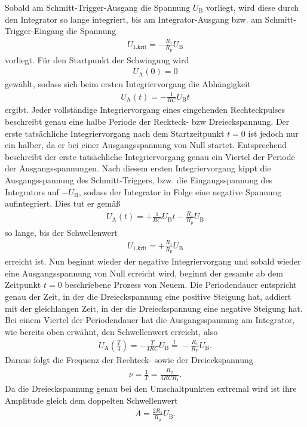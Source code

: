 Sobald am Schmitt-Trigger-Ausgang die Spannung $U_\text{B}$ vorliegt, wird diese
durch den Integrator so lange integriert, bis am Integrator-Ausgang bzw. am Schmitt-Trigger-Eingang die Spannung
\begin{align}
  U_\text{1,krit} = - \frac{R_1}{R_\text{p}} U_\text{B}
\end{align}
vorliegt. Für den Startpunkt der Schwingung wird
\begin{align}
  U_\text{A}(0) = 0
\end{align}
gewählt, sodass sich beim ersten Integriervorgang die Abhängigkeit
\begin{align}
  U_\text{A}(t) = -\frac1{RC} U_\text{B} t
\end{align}
ergibt. Jeder vollständige Integriervorgang eines eingehenden Rechteckpulses beschreibt genau eine halbe Periode
der Reckteck- bzw Dreieckspannung. Der erste tatsächliche Integriervorgang nach dem Startzeitpunkt $t=0$ ist jedoch
nur ein halber, da er bei einer Ausgangsspannung von Null startet. Entsprechend beschreibt der erste
tatsächliche Integriervorgang genau ein Viertel der Periode der Ausgangsspannungen.
Nach diesem ersten Integriervorgang kippt die Ausgangsspannung des Schmitt-Triggers, bzw. die Eingangsspannung
des Integrators auf $-U_\text{B}$, sodass der Integrator in Folge eine negative Spannung
aufintegriert. Dies tut er gemäß
\begin{align}
  U_\text{A}(t) = + \frac1{RC} U_\text{B} t - \frac{R_1}{R_\text{p}} U_\text{B}
\end{align}
so lange, bis der Schwellenwert
\begin{align}
  U_\text{1,krit} = + \frac{R_1}{R_\text{p}} U_\text{B}
\end{align}
erreicht ist. Nun beginnt wieder der negative Integriervorgang und sobald wieder eine Ausgangsspannung von Null
erreicht wird, beginnt der gesamte ab dem Zeitpunkt $t=0$ beschriebene Prozess von Neuem. Die Periodendauer entspricht genau der Zeit, in der die Dreieckspannung eine positive
Steigung hat, addiert mit der gleichlangen Zeit, in der die Dreieckspannung eine negative Steigung hat. Bei einem Viertel der Periodendauer
hat die Ausgangsspannung am Integrator, wie bereits oben erwähnt, den
Schwellenwert erreicht, also
\begin{align}
  U_\text{A}\left( \frac{T}{4} \right) = -\frac{T}{4RC} U_\text{B} \stackrel{!}{=} -\frac{R_1}{R_\text{P}} U_\text{B}.
\end{align}
Daraus folgt die Frequenz der Rechteck- sowie der Dreieckspannung
\begin{align}
  \nu = \frac1{T} = \frac{R_\text{p}}{4 R C R_1}.
  \label{eqn:freq_signalgen}
\end{align}
Da die Dreieckspannung genau bei den Umschaltpunkten extremal wird ist ihre Amplitude gleich dem
doppelten Schwellenwert
\begin{align}
  A = \frac{2 R_1}{R_\text{p}} U_\text{B}.
  \label{eqn:ampl_drei}
\end{align}

